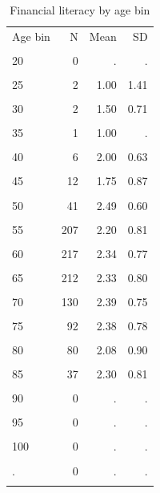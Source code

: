 \begin{table}[htbp]\centering\small
\caption{Financial literacy by age bin}
\label{tab:finlit_by_age}
\begin{tabular}{lrrr}\toprule
Age bin & N & Mean & SD \\\\ \midrule
20 & 0 & . & . \\\\
25 & 2 & 1.00 & 1.41 \\\\
30 & 2 & 1.50 & 0.71 \\\\
35 & 1 & 1.00 & . \\\\
40 & 6 & 2.00 & 0.63 \\\\
45 & 12 & 1.75 & 0.87 \\\\
50 & 41 & 2.49 & 0.60 \\\\
55 & 207 & 2.20 & 0.81 \\\\
60 & 217 & 2.34 & 0.77 \\\\
65 & 212 & 2.33 & 0.80 \\\\
70 & 130 & 2.39 & 0.75 \\\\
75 & 92 & 2.38 & 0.78 \\\\
80 & 80 & 2.08 & 0.90 \\\\
85 & 37 & 2.30 & 0.81 \\\\
90 & 0 & . & . \\\\
95 & 0 & . & . \\\\
100 & 0 & . & . \\\\
. & 0 & . & . \\\\
\bottomrule
\end{tabular}\end{table}
